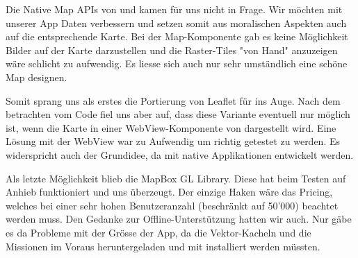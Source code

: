 Die Native Map APIs von  und  kamen für uns nicht in Frage.
Wir möchten mit unserer App  Daten verbessern und setzen somit aus moralischen Aspekten auch auf die entsprechende Karte.
Bei der  Map-Komponente gab es keine Möglichkeit Bilder auf der Karte darzustellen und die Raster-Tiles "von Hand" anzuzeigen wäre schlicht zu aufwendig. 
Es liesse sich auch nur sehr umständlich eine schöne Map designen.

Somit sprang uns als erstes die Portierung von Leaflet für  ins Auge. 
Nach dem betrachten vom Code fiel uns aber auf, dass diese Variante eventuell nur möglich ist, wenn die Karte in einer WebView-Komponente von  dargestellt wird.
Eine Lösung mit der WebView war zu Aufwendig um richtig getestet zu werden. 
Es widerspricht auch der Grundidee, da mit  native Applikationen entwickelt werden.

Als letzte Möglichkeit blieb die MapBox GL Library.
Diese hat beim Testen auf Anhieb funktioniert und uns überzeugt.
Der einzige Haken wäre das Pricing, welches bei einer sehr hohen Benutzeranzahl (beschränkt auf 50'000) beachtet werden muss.
Den Gedanke zur Offline-Unterstützung hatten wir auch.
Nur gäbe es da Probleme mit der Grösse der App, da die Vektor-Kacheln und die Missionen im Voraus heruntergeladen und mit installiert werden müssten.

